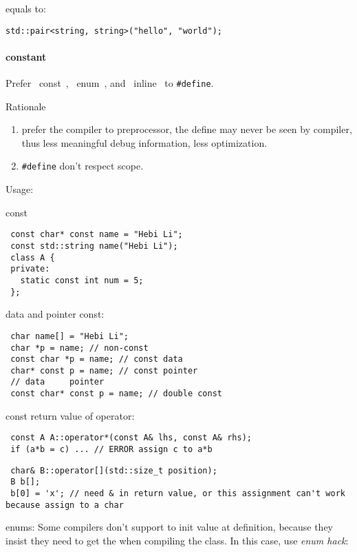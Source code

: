 equals to:

\begin{lstlisting}
std::pair<string, string>("hello", "world");
\end{lstlisting}

\paragraph{constant}
Prefer ~const~, ~enum~, and ~inline~ to \verb$#define$.

Rationale
\begin{enumerate}
\item prefer the compiler to preprocessor, the define may never be
  seen by compiler, thus less meaningful debug information, less
  optimization.
\item \verb$#define$ don't respect scope.
\end{enumerate}

Usage:

const

\begin{lstlisting}
 const char* const name = "Hebi Li";
 const std::string name("Hebi Li");
 class A {
 private:
   static const int num = 5;
 };
\end{lstlisting}

data and pointer const:

\begin{lstlisting}
 char name[] = "Hebi Li";
 char *p = name; // non-const
 const char *p = name; // const data
 char* const p = name; // const pointer
 // data     pointer
 const char* const p = name; // double const
\end{lstlisting}

const return value of operator:

\begin{lstlisting}
 const A A::operator*(const A& lhs, const A& rhs);
 if (a*b = c) ... // ERROR assign c to a*b
\end{lstlisting}

\begin{lstlisting}
 char& B::operator[](std::size_t position);
 B b[];
 b[0] = 'x'; // need & in return value, or this assignment can't work because assign to a char
\end{lstlisting}

enums: Some compilers don't support to init value at definition,
because they insist they need to get the when compiling the class.  In
this case, use \textit{enum hack}:

